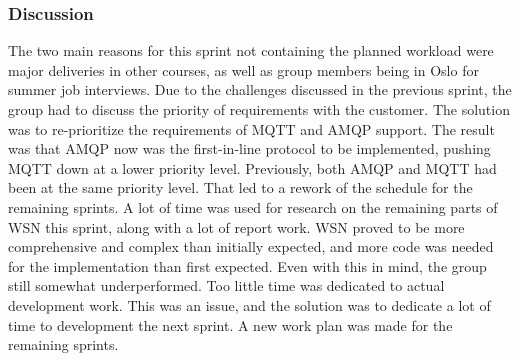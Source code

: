 \subsubsection{Discussion}
\label{subsec:project_lifecycle-development-sprint_4-discussion}

The two main reasons for this sprint not containing the planned workload were major deliveries in other courses, as well as group members being in Oslo for summer job interviews.
Due to the challenges discussed in the previous sprint, the group had to discuss the priority of requirements with the customer. The solution was to re-prioritize the requirements of MQTT and AMQP support. The result was that AMQP now was the first-in-line protocol to be implemented, pushing MQTT down at a lower priority level. Previously, both AMQP and MQTT had been at the same priority level. That led to a rework of the schedule for the remaining sprints. A lot of time was used for research on the remaining parts of WSN this sprint, along with a lot of report work. WSN proved to be more comprehensive and complex than initially expected, and more code was needed for the implementation than first expected. Even with this in mind, the group still somewhat underperformed. Too little time was dedicated to actual development work. This was an issue, and the solution was to dedicate a lot of time to development the next sprint. A new work plan was made for the remaining sprints.



